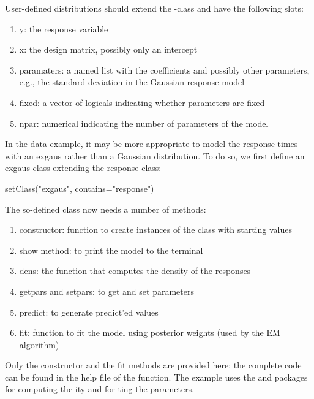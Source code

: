 \documentclass[article]{jss}
\begin{document}
User-defined distributions should extend the -class and
have the following slots:
\begin{enumerate}
	\item y: the response variable
	\item x: the design matrix, possibly only an intercept
	\item paramaters: a named list with the coefficients and possibly 
	other parameters, e.g., the standard deviation in the Gaussian 
	response model
	\item fixed: a vector of logicals indicating whether parameters are 
	fixed
	\item npar: numerical indicating the number of parameters of the model
\end{enumerate}

In the  data example, it may be more appropriate to model
the response times with an exgaus rather than a Gaussian distribution.
To do so, we first define an exgaus-class extending the
response-class:
\begin{CodeChunk}
\begin{CodeInput}
setClass("exgaus", contains="response")
\end{CodeInput}
\end{CodeChunk}

The so-defined class now needs a number of methods: 
\begin{enumerate}
	\item constructor: function to create instances of the class 
	with starting values
	\item show method: to print the model to the terminal
	\item dens: the function that computes the density of the responses
	\item getpars and setpars: to get and set parameters 
	\item predict: to generate predict'ed values 
	\item fit: function to fit the model using posterior weights (used 
	by the EM algorithm)
\end{enumerate}

Only the constructor and the fit methods are provided here; the
complete code can be found in the help file of the 
function.  The  example uses the  and
 packages
\citep{Stasinopoulos2009a,Stasinopoulos2009b} for computing the
ity and for ting the parameters.
\end{document}
